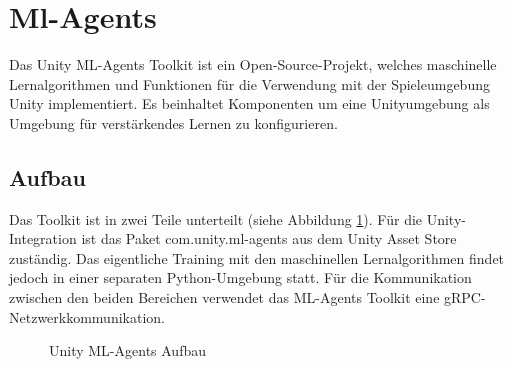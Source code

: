 {\section{Ml-Agents}}
\label{sec:mlagents}
Das Unity ML-Agents Toolkit ist ein Open-Source-Projekt, welches maschinelle Lernalgorithmen und Funktionen für die Verwendung mit der Spieleumgebung Unity implementiert. Es beinhaltet Komponenten um eine Unityumgebung als Umgebung für verstärkendes Lernen zu konfigurieren.\cite{juliani2020}

\subsection{Aufbau}
Das Toolkit ist in zwei Teile unterteilt (siehe Abbildung \ref{fig:mlagents_aufbau}). Für die Unity-Integration ist das Paket com.unity.ml-agents aus dem Unity Asset Store zuständig. Das eigentliche Training mit den maschinellen Lernalgorithmen findet jedoch in einer separaten Python-Umgebung statt. Für die Kommunikation zwischen den beiden Bereichen verwendet das ML-Agents Toolkit eine gRPC-Netzwerkkommunikation.\cite{juliani2020}

\begin{figure}[H]
  \centering  
  \caption{Unity ML-Agents Aufbau}
  \label{fig:mlagents_aufbau}
\end{figure}

